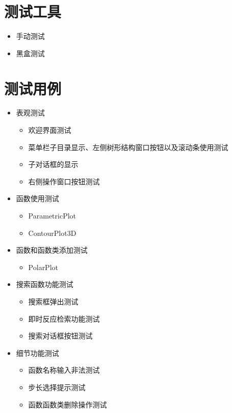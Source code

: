 \documentclass[hyperref, UTF8
,bookmarksnumbered=true, oneside]{ctexbook}
\begin{document}

	\section{测试工具} %
		\begin{itemize}
			\item 手动测试
			\item 黑盒测试
		\end{itemize}
	

	\section{测试用例} %
		\begin{itemize}
			\item 表观测试
				\begin{itemize}
					\item 欢迎界面测试
					\item 菜单栏子目录显示、左侧树形结构窗口按钮以及滚动条使用测试
					\item 子对话框的显示
					\item 右侧操作窗口按钮测试
				\end{itemize}
			\item 函数使用测试
				\begin{itemize}
					\item ParametricPlot
					\item ContourPlot3D
				\end{itemize}
			\item 函数和函数类添加测试
				\begin{itemize}
					\item PolarPlot
				\end{itemize}
			\item 搜索函数功能测试
				\begin{itemize}
					\item 搜索框弹出测试
					\item 即时反应检索功能测试
					\item 搜索对话框按钮测试
				\end{itemize}
			\item 细节功能测试
				\begin{itemize}
					\item 函数名称输入非法测试
					\item 步长选择提示测试
					\item 函数函数类删除操作测试
				\end{itemize}
		\end{itemize}
	
\end{document}

